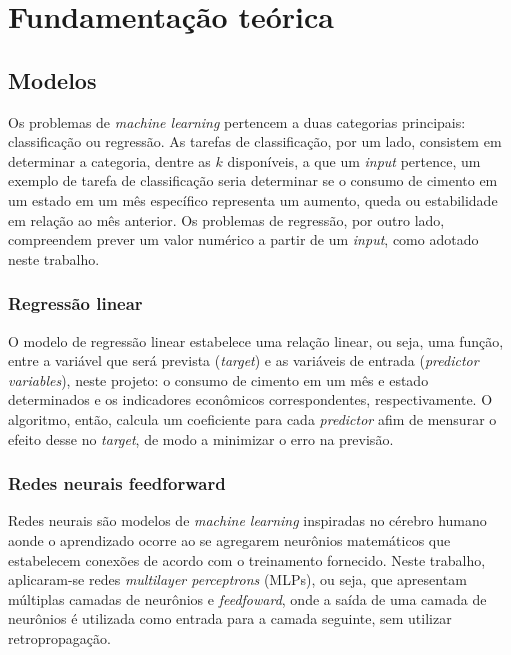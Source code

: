 
\chapter{Fundamentação teórica}

\section{Modelos}

Os problemas de \textit{machine learning} pertencem a duas categorias principais: classificação ou regressão. As tarefas de classificação, por um lado, consistem em determinar a categoria, dentre as $k$ disponíveis, a que um \textit{input} pertence, um exemplo de tarefa de classificação seria determinar se o consumo de cimento em um estado em um mês específico representa um aumento, queda ou estabilidade em relação ao mês anterior. Os problemas de regressão, por outro lado, compreendem prever um valor numérico a partir de um \textit{input}, \cite{Goodfellow-et-al-2016} como adotado neste trabalho.
  
\subsection{Regressão linear}
O modelo de regressão linear estabelece uma relação linear, ou seja, uma função, entre a variável que será prevista (\textit{target}) e as variáveis de entrada (\textit{predictor variables}), neste projeto: o consumo de cimento em um mês e estado determinados e os indicadores econômicos correspondentes, respectivamente. O algoritmo, então, calcula um coeficiente para cada \textit{predictor} afim de mensurar o efeito desse no \textit{target}, de modo a minimizar o erro na previsão.
        
\subsection{Redes neurais feedforward}
Redes neurais são modelos de \textit{machine learning} inspiradas no cérebro humano aonde o aprendizado ocorre ao se agregarem neurônios matemáticos que estabelecem conexões de acordo com o treinamento fornecido. Neste trabalho, aplicaram-se redes \textit{multilayer perceptrons} (MLPs), ou seja, que apresentam múltiplas camadas de neurônios e \textit{feedfoward}, onde a saída de uma camada de neurônios é utilizada como entrada para a camada seguinte, sem utilizar retropropagação.
          
